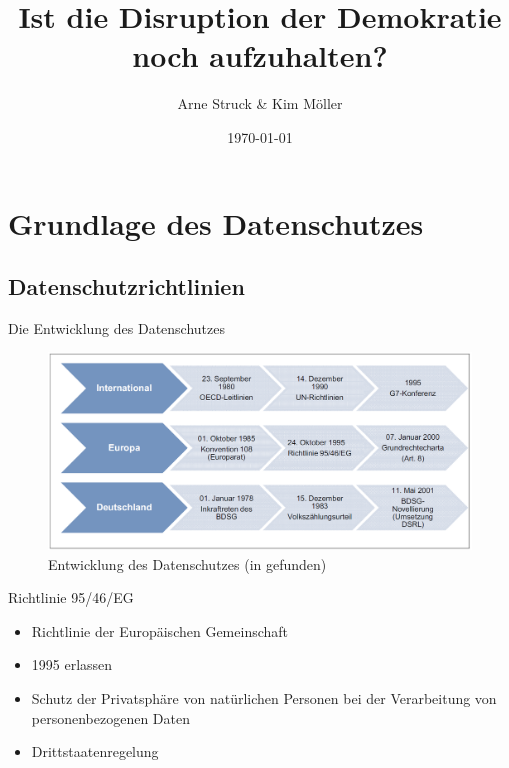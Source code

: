 \documentclass{beamer}
\title{Ist die Disruption der Demokratie noch aufzuhalten?}
\subtitle{}
\author{Arne Struck \& Kim Möller}
\institute{Universität Hamburg, Fachschaft Informatik, Des Googles Kern}
\date{\today}
\begin{document}
\begin{frame}
\maketitle
\end{frame}

\begin{frame}{}
\tableofcontents
\end{frame}

\section{Grundlage des Datenschutzes}
\subsection{Datenschutzrichtlinien}
\begin{frame}{Die Entwicklung des Datenschutzes}
\begin{figure}[h]
\begin{center}
	\includegraphics[scale=0.3]{datenschutz.png}
\end{center}
\caption{Entwicklung des Datenschutzes (in \cite{europData} gefunden)}
\label{pic:datenschutz}
\end{figure}
\end{frame}

\begin{frame}{Richtlinie 95/46/EG}
\begin{itemize}
	\item Richtlinie der Europäischen Gemeinschaft
	\item 1995 erlassen
	\item Schutz der Privatsphäre von natürlichen Personen bei der Verarbeitung von personenbezogenen Daten
	\item Drittstaatenregelung
\end{itemize}
\end{frame}
\end{document}
